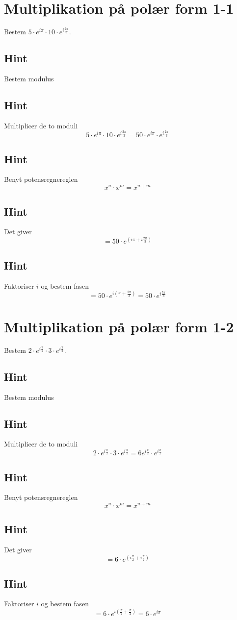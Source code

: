 \documentclass{article}
\newenvironment{exercise}[1]{\newpage\section{#1}}{}
\newcommand{\answerbox}[1]{\fbox{$#1$}}
\newcommand{\hint}{\subsection*{Hint}}
\begin{document}
\tableofcontents
\newpage

\begin{exercise}{Multiplikation på polær form 1-1}

Bestem $5 \cdot e^{i \pi} \cdot 10 \cdot e^{i \frac{2 \pi}{3}}$.

\answerbox{50 \cdot e^{i \frac{5\pi }{3}}}


\hint 

Bestem modulus


\hint

Multiplicer de to moduli 
\[
5 \cdot e^{i \pi} \cdot 10 \cdot e^{i \frac{2 \pi}{3}} = 50 \cdot e^{i \pi} \cdot e^{i \frac{2 \pi}{3}}
\]

\hint 

Benyt potensregnereglen
\[
x^n \cdot x^m = x^{n+m}
\]

\hint

Det giver
\[
=50 \cdot e^{(i \pi +i \frac{2 \pi}{3})} 
\]

\hint

Faktoriser $i$ og bestem fasen
\[
= 50 \cdot e^{i( \pi +\frac{2 \pi}{3})}  = 50 \cdot e^{i \frac{5\pi }{3}}
\]


\end{exercise}

\newpage

\begin{exercise}{Multiplikation på polær form 1-2}
	
	Bestem $2 \cdot e^{i \frac{\pi}{2}} \cdot 3 \cdot e^{i \frac{\pi}{2}}$.
	
	\answerbox{6 \cdot e^{i \pi}}
	
	
	\hint 
	
	Bestem modulus
	
	
	\hint
	
	Multiplicer de to moduli 
	\[
	2 \cdot e^{i \frac{\pi}{2}} \cdot 3 \cdot e^{i \frac{\pi}{2}} = 6 e^{i \frac{\pi}{2}} \cdot e^{i \frac{\pi}{2}}
	\]
	
	\hint 
	
	Benyt potensregnereglen
	\[
	x^n \cdot x^m = x^{n+m}
	\]
	
	\hint
	
	Det giver
	\[
	= 6 \cdot e^{(i \frac{\pi}{2}+ i \frac{\pi}{2})}
	\]
	
	\hint
	
	Faktoriser $i$ og bestem fasen
	\[
	= 6 \cdot e^{i( \frac{\pi}{2}+\frac{\pi}{2})} = 6 \cdot e^{i \pi}
	\]
	
	
\end{exercise}
\end{document}
